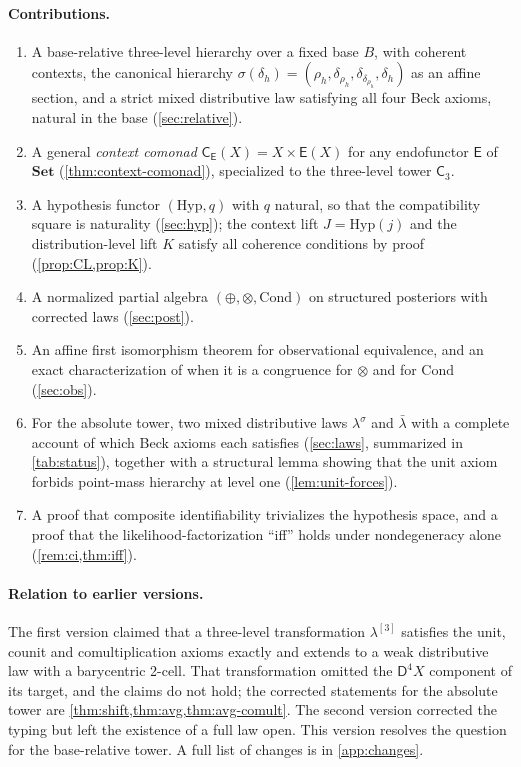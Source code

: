 \documentclass[11pt]{article}
\theoremstyle{definition}
\theoremstyle{remark}
\newcommand{\D}{\mathsf{D}}
\newcommand{\Set}{\mathbf{Set}}
\newcommand{\Hyp}{\mathrm{Hyp}}
\newcommand{\Cond}{\mathrm{Cond}}
\newcommand{\C}{\mathsf{C}}
\newcommand{\E}{\mathsf{E}}
\newcommand{\lb}{\bar\lambda}
\newcommand{\ls}{\lambda^{\sigma}}
\begin{document}
\paragraph{Contributions.}
\begin{enumerate}[leftmargin=*]
\item A base-relative three-level hierarchy over a fixed base $B$, with coherent contexts, the
  canonical hierarchy $\sigma(\delta_h)=(\rho_h,\delta_{\rho_h},\delta_{\delta_{\rho_h}},\delta_h)$ as an
  affine section, and a strict mixed distributive law satisfying all four Beck axioms, natural in the
  base (\cref{sec:relative}).
\item A general \emph{context comonad} $\C_\E(X)=X\times\E(X)$ for any endofunctor $\E$ of $\Set$
  (\cref{thm:context-comonad}), specialized to the three-level tower $\C_3$.
\item A hypothesis functor $(\Hyp,q)$ with $q$ natural, so that the compatibility square is
  naturality (\cref{sec:hyp}); the context lift $J=\Hyp(j)$ and the distribution-level lift $K$
  satisfy all coherence conditions by proof (\cref{prop:CL,prop:K}).
\item A normalized partial algebra $(\oplus,\otimes,\Cond)$ on structured posteriors with corrected
  laws (\cref{sec:post}).
\item An affine first isomorphism theorem for observational equivalence, and an exact
  characterization of when it is a congruence for $\otimes$ and for $\Cond$ (\cref{sec:obs}).
\item For the absolute tower, two mixed distributive laws $\ls$ and $\lb$ with a complete account
  of which Beck axioms each satisfies (\cref{sec:laws}, summarized in \cref{tab:status}), together with a structural lemma
  showing that the unit axiom forbids point-mass hierarchy at level one (\cref{lem:unit-forces}).
\item A proof that composite identifiability trivializes the hypothesis space, and a proof that the
  likelihood-factorization ``iff'' holds under nondegeneracy alone (\cref{rem:ci,thm:iff}).
\end{enumerate}

\paragraph{Relation to earlier versions.} The first version claimed that a three-level
transformation $\lambda^{[3]}$ satisfies the unit, counit and comultiplication axioms exactly and
extends to a weak distributive law with a barycentric 2-cell. That transformation omitted the
$\D^4X$ component of its target, and the claims do not hold; the corrected statements for the
absolute tower are \cref{thm:shift,thm:avg,thm:avg-comult}. The second version corrected the typing
but left the existence of a full law open. This version resolves the question for the base-relative
tower. A full list of changes is in \cref{app:changes}.
\end{document}
